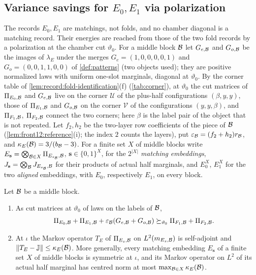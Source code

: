 \subsection{Variance savings for \texorpdfstring{$E_0,E_1$}{E\_0,E\_1} via polarization}\label{subsec:variance:matching}

The records $E_0,E_1$ are matchings, not folds, and no chamber diagonal is a
matching record. Their energies are reached from those of the two fold records
by a polarization at the chamber cut $\vartheta_0$. For a middle block $\mathcal B$ let
$G_{e,\mathcal B}$ and $G_{o,\mathcal B}$ be the images of $\lambda_E$ under the merges
$G_e=(1,0,0,0,0,1)$ and $G_o=(0,0,1,1,0,0)$ of \cref{def:patterns} (two objects
used); they are positive normalized laws with uniform one-slot marginals,
diagonal at $\vartheta_0$. By the corner table of
\cref{lem:record:fold-identification}(f) (\cref{tab:corner}), at $\vartheta_0$
the cut matrices of $\Pi_{E_0,\mathcal B}$ and $G_{e,\mathcal B}$ live on the corner
$\mathcal U$ of the plus-half configurations $(\beta,y,y)$, those of
$\Pi_{E_1,\mathcal B}$ and $G_{o,\mathcal B}$ on the corner $\mathcal V$ of the configurations
$(y,y,\beta)$, and $\Pi_{F_1,\mathcal B}$, $\Pi_{F_2,\mathcal B}$ connect the two corners; here
$\beta$ is the label pair of the object that is not repeated. Let $f_2,h_2$ be
the two-layer row coefficients of the piece of $\mathcal B$
(\cref{lem:front12:reference}(i); the index $2$ counts the layers), put
$\varepsilon_\mathcal B=(f_2+h_2)r_\mathcal B$, and
$\kappa_E(\mathcal B)=3/(b_\mathcal B-3)$. For a finite set $X$ of middle blocks write
$E_{\mathbf s}=\bigotimes_{\mathcal B\in X}\Pi_{E_{s_\mathcal B},\mathcal B}$, $\mathbf s\in\{0,1\}^X$,
for the $2^{|X|}$ \emph{matching embeddings},
$J_{\mathbf s}=\bigotimes_\mathcal B J_{E_{s_\mathcal B},\mathcal B}$ for their products of actual
half marginals, and $E^X_0$, $E^X_1$ for the two \emph{aligned} embeddings, with
$E_0$, respectively $E_1$, on every block.

\begin{lemma}\label{lem:record:paired-e-bridge}
Let $\mathcal B$ be a middle block.
\begin{enumerate}[label=(\alph*)]
\item As cut matrices at $\vartheta_0$ of laws on the labels of $\mathcal B$,
 \[
  \Pi_{E_0,\mathcal B}+\Pi_{E_1,\mathcal B}+\varepsilon_\mathcal B(G_{e,\mathcal B}+G_{o,\mathcal B})
  \succeq_{\vartheta_0}\Pi_{F_1,\mathcal B}+\Pi_{F_2,\mathcal B}.
 \]
\item At $\iota$ the Markov operator $T_E$ of $\Pi_{E_s,\mathcal B}$ on
 $L^2(m_{E_s,\mathcal B})$ is self-adjoint and $\|T_E-\mathbb J\|\le\kappa_E(\mathcal B)$. More
 generally, every matching embedding $E_{\mathbf s}$ of a finite set $X$ of
 middle blocks is symmetric at $\iota$, and its Markov operator on $L^2$ of its
 actual half marginal has centred norm at most $\max_{\mathcal B\in X}\kappa_E(\mathcal B)$.
\end{enumerate}
\end{lemma}

